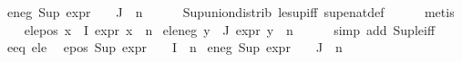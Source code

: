 \begin{isabellebody}
\ e{}{\isacharunderscore}{\kern0pt}neg{\isacharcolon}{\kern0pt}\ {\isachardoublequoteopen}Sup\ {\isacharparenleft}{\kern0pt}{\isacharparenleft}{\kern0pt}expr{\isacharunderscore}{\kern0pt}{}\ {\isasymcirc}\ {\isasymPhi}{\isacharparenright}{\kern0pt}\ {\isacharbackquote}{\kern0pt}\ J{\isacharparenright}{\kern0pt}\ {\isasymle}\ n{}{\isachardoublequoteclose}\isanewline
\ \ \ \ \isamarkupfalse%
\ Sup{\isacharunderscore}{\kern0pt}union{\isacharunderscore}{\kern0pt}distrib\ le{\isacharunderscore}{\kern0pt}sup{\isacharunderscore}{\kern0pt}iff\ sup{\isacharunderscore}{\kern0pt}enat{\isacharunderscore}{\kern0pt}def\isanewline
\ \ \ \ \isamarkupfalse%
\ metis{\isacharplus}{\kern0pt}\isanewline
\ \ \isamarkupfalse%
\ e{}{\isacharunderscore}{\kern0pt}le{\isacharunderscore}{\kern0pt}pos{\isacharcolon}{\kern0pt}\ {\isachardoublequoteopen}{\isasymforall}x{\isasymin}{\isasymPhi}\ {\isacharbackquote}{\kern0pt}\ I{\isachardot}{\kern0pt}\ expr{\isacharunderscore}{\kern0pt}{}\ x\ {\isasymle}\ n{}{\isachardoublequoteclose}\isanewline
{}\ e{}{\isacharunderscore}{\kern0pt}le{\isacharunderscore}{\kern0pt}neg{\isacharcolon}{\kern0pt}\ {\isachardoublequoteopen}{\isasymforall}y{\isasymin}{\isasymPhi}\ {\isacharbackquote}{\kern0pt}\ J{\isachardot}{\kern0pt}\ expr{\isacharunderscore}{\kern0pt}{}\ y\ {\isasymle}\ n{}{\isachardoublequoteclose}\isanewline
\ \ \ \ \isamarkupfalse%
\ {\isacharparenleft}{\kern0pt}simp\ add{\isacharcolon}{\kern0pt}\ Sup{\isacharunderscore}{\kern0pt}le{\isacharunderscore}{\kern0pt}iff{\isacharparenright}{\kern0pt}{\isacharplus}{\kern0pt}\isanewline
\isanewline
\ \ \isamarkupfalse%
\ e{}{\isacharunderscore}{\kern0pt}eq\ e{}{\isacharunderscore}{\kern0pt}le\ \isamarkupfalse%
\ e{}{\isacharunderscore}{\kern0pt}pos{\isacharcolon}{\kern0pt}\ {\isachardoublequoteopen}Sup\ {\isacharparenleft}{\kern0pt}{\isacharparenleft}{\kern0pt}expr{\isacharunderscore}{\kern0pt}{}\ {\isasymcirc}\ {\isasymPhi}{\isacharparenright}{\kern0pt}\ {\isacharbackquote}{\kern0pt}\ I{\isacharparenright}{\kern0pt}\ {\isacharless}{\kern0pt}{\isacharequal}{\kern0pt}\ n{}{\isachardoublequoteclose}\isanewline
{}\ e{}{\isacharunderscore}{\kern0pt}neg{\isacharcolon}{\kern0pt}\ {\isachardoublequoteopen}Sup\ {\isacharparenleft}{\kern0pt}{\isacharparenleft}{\kern0pt}expr{\isacharunderscore}{\kern0pt}{}\ {\isasymcirc}\ {\isasymPhi}{\isacharparenright}{\kern0pt}\ {\isacharbackquote}{\kern0pt}\ J{\isacharparenright}{\kern0pt}\ {\isasymle}\ n{}{\isachardoublequoteclose}\isanewline

\end{isabellebody}
